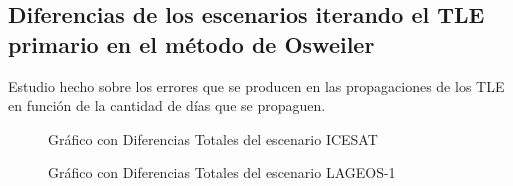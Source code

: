 \subsection*{Diferencias de los escenarios iterando el TLE primario en el m\'etodo de Osweiler}
Estudio hecho sobre los errores que se producen en las propagaciones de los TLE en funci\'on de la cantidad de d\'ias que se propaguen.\\

\begin{figure}[h!]
\centering
  \caption{Gr\'afico con Diferencias Totales del escenario ICESAT}
  \label{fig:icesatTot}
\end{figure}

\begin{figure}[h!]
\centering
  \caption{Gr\'afico con Diferencias Totales del escenario LAGEOS-1}
  \label{fig:lageosTot}
\end{figure}

